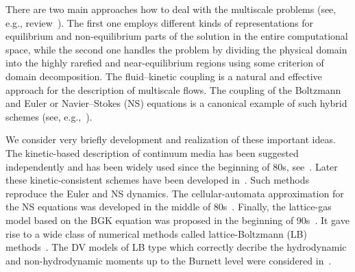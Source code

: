 \documentclass{elsarticle} %
\begin{document}
There are two main approaches how to deal with the multiscale problems (see, e.g., review~\cite{Dimarco2014}).
The first one employs different kinds of representations for equilibrium and non-equilibrium parts of the solution
in the entire computational space, while the second one handles the problem by dividing the physical domain
into the highly rarefied and near-equilibrium regions using some criterion of domain decomposition.
The fluid--kinetic coupling is a natural and effective approach for the description of multiscale flows.
The coupling of the Boltzmann and Euler or Navier--Stokes (NS) equations
is a canonical example of such hybrid schemes (see, e.g.,~\cite{Bourgat1996, Tallec1997}).

We consider very briefly development and realization of these important ideas.
The kinetic-based description of continuum media has been suggested independently and has been widely used since the beginning of 80s,
see~\cite{Potkin1975, Pullin1980, Reitz1981, Aristov1983}. Later these kinetic-consistent schemes have been developed
in~\cite{Elizarova1985, Deshpande1986, Prendergast1993, Chou1997, Ohwada2004Xu, Ohwada2004Kobayashi, Ohwada2006}.
Such methods reproduce the Euler and NS dynamics.
The cellular-automata approximation for the NS equations was developed in the middle of 80s~\cite{Frisch1986}.
Finally, the lattice-gas model based on the BGK equation was proposed in the beginning of 90s~\cite{Qian1992}.
It gave rise to a wide class of numerical methods called lattice-Boltzmann (LB) methods~\cite{Higuera1989,Benzi1992,Succi2001}.
The DV models of LB type which correctly decribe the hydrodynamic and non-hydrodynamic moments
up to the Burnett level were considered in~\cite{Xu2018, Xu2019}.
\end{document}
